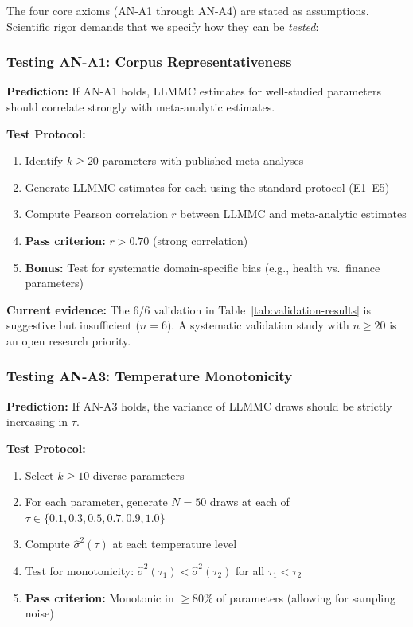 The four core axioms (AN-A1 through AN-A4) are stated as assumptions. Scientific
rigor demands that we specify how they can be \textit{tested}:

\subsubsection{Testing AN-A1: Corpus Representativeness}
\label{sec:AN-test-A1}

\textbf{Prediction:} If AN-A1 holds, LLMMC estimates for well-studied parameters
should correlate strongly with meta-analytic estimates.

\textbf{Test Protocol:}
\begin{enumerate}[nosep]
    \item Identify $k \geq 20$ parameters with published meta-analyses
    \item Generate LLMMC estimates for each using the standard protocol (E1--E5)
    \item Compute Pearson correlation $r$ between LLMMC and meta-analytic estimates
    \item \textbf{Pass criterion:} $r > 0.70$ (strong correlation)
    \item \textbf{Bonus:} Test for systematic domain-specific bias
          (e.g., health vs.\ finance parameters)
\end{enumerate}

\textbf{Current evidence:} The 6/6 validation in Table~\ref{tab:validation-results}
is suggestive but insufficient ($n = 6$). A systematic validation study with
$n \geq 20$ is an open research priority.

\subsubsection{Testing AN-A3: Temperature Monotonicity}
\label{sec:AN-test-A3}

\textbf{Prediction:} If AN-A3 holds, the variance of LLMMC draws should be strictly
increasing in $\tau$.

\textbf{Test Protocol:}
\begin{enumerate}[nosep]
    \item Select $k \geq 10$ diverse parameters
    \item For each parameter, generate $N = 50$ draws at each of
          $\tau \in \{0.1, 0.3, 0.5, 0.7, 0.9, 1.0\}$
    \item Compute $\hat{\sigma}^2(\tau)$ at each temperature level
    \item Test for monotonicity:
          $\hat{\sigma}^2(\tau_1) < \hat{\sigma}^2(\tau_2)$ for all $\tau_1 < \tau_2$
    \item \textbf{Pass criterion:} Monotonic in $\geq 80\%$ of parameters
          (allowing for sampling noise)
\end{enumerate}

